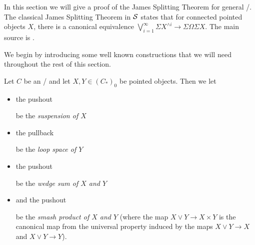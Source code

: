 In this section we will give a proof of the James Splitting Theorem for general \inftytops/.
The classical James Splitting Theorem in $\mathcal{S}$ states that for connected pointed objects $X$, there is a canonical equivalence $\bigvee\limits_{i=1}^{\infty}\Sigma X^{\wedge i}\to\Sigma\Omega\Sigma X$.
The main source is \cite[\S 2.2 and \S 4]{splittings_21}.

We begin by introducing some well known constructions that we will need throughout the rest of this section.
\begin{definition}
    Let $C$ be an \inftytop/ and let $X,Y\in \left(C_*\right)_0$ be pointed objects. 
    Then we let 
    \begin{itemize}
        \item the pushout
        \begin{center}
        \end{center}
        be the \emph{suspension of $X$}
        \item the pullback
        \begin{center}
        \end{center}
        be the \emph{loop space of $Y$}
        \item the pushout
        \begin{center}
        \end{center}
        be the \emph{wedge sum of $X$ and $Y$} 
        \item and the pushout 
        \begin{center}
        \end{center}
        be the \emph{smash product of $X$ and $Y$} (where the map $X\vee Y\to X\times Y$ is the canonical map from the universal property induced by the maps $X\vee Y\to X$ and $X\vee Y\to Y$).
    \end{itemize}
\end{definition}
